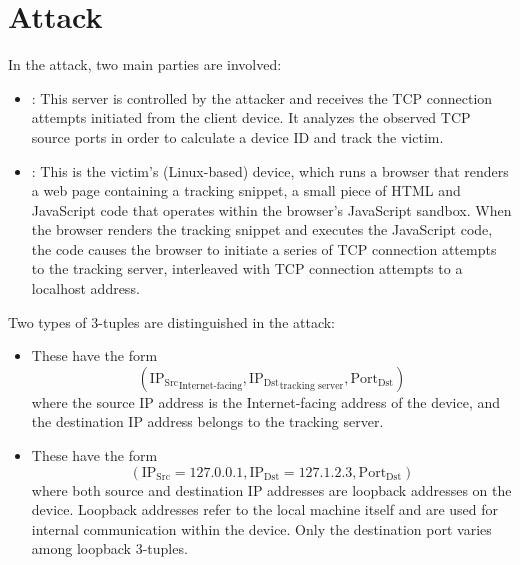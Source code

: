 \documentclass{report}
\begin{document}
\chapter{Attack}
\label{sec:attack}

In the attack, two main parties are involved:

\begin{itemize}
	\item {}: This server is controlled by the \alert{attacker} and receives the TCP connection attempts initiated from the client device. It analyzes the observed TCP source ports in order to calculate a device ID and track the victim.%

	\item {}: This is the \alert{victim’s} (Linux-based) device, which runs a browser that renders a web page containing a \alert{tracking snippet}, a small piece of HTML and JavaScript code that operates within the browser’s JavaScript sandbox. When the browser renders the tracking snippet and executes the JavaScript code, the code causes the browser to initiate a series of TCP connection attempts to the \alert{tracking server}, interleaved with TCP connection attempts to a \alert{localhost address}.
\end{itemize}

Two types of 3-tuples are distinguished in the attack:

\begin{itemize}
	\item {} These have the form
	\begin{equation*}
		(\mathrm{IP_{Src}}_{\text{Internet-facing}}, \mathrm{IP_{Dst}}_{\text{tracking server}}, \mathrm{Port_{Dst}})
	\end{equation*}
	where the source IP address is the Internet-facing address of the device, and the destination IP address belongs to the tracking server.

	\item {} These have the form
	\begin{equation*}
		(\mathrm{IP_{Src}} = 127.0.0.1, \mathrm{IP_{Dst}} = 127.1.2.3, \mathrm{Port_{Dst}})
	\end{equation*}
	where both source and destination IP addresses are loopback addresses on the device. \alert{Loopback addresses} refer to the local machine itself and are used for internal communication within the device. Only the \alert{destination port} varies among loopback 3-tuples.
\end{itemize}
\end{document}
